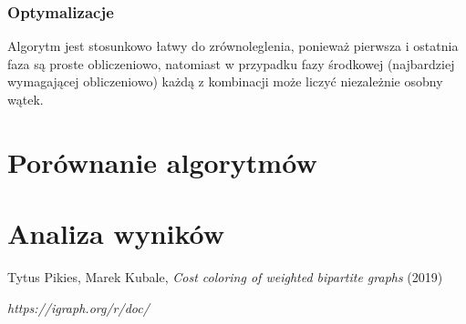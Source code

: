 \documentclass{article}
\begin{document}
\subsubsection*{Optymalizacje}

Algorytm jest stosunkowo łatwy do zrównoleglenia, ponieważ pierwsza i ostatnia faza są proste obliczeniowo, natomiast w przypadku fazy środkowej (najbardziej wymagającej obliczeniowo) każdą z kombinacji może liczyć niezależnie osobny wątek.



\section{Porównanie algorytmów}

\section{Analiza wyników}

\begin{thebibliography}{9}

Tytus Pikies, Marek Kubale,
\emph{Cost coloring of weighted bipartite graphs}
(2019)

\emph{https://igraph.org/r/doc/}

\end{thebibliography}
\end{document}
